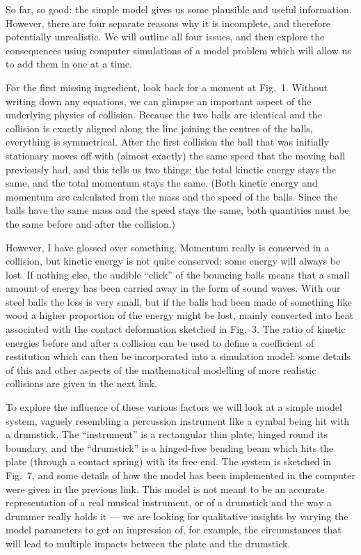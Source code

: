 
  So far, so good: the simple model gives us some plausible and useful 
  information. However, there are four separate reasons why it is incomplete, 
  and therefore potentially unrealistic. We will outline all four issues, and 
  then explore the consequences using computer simulations of a model problem 
  which will allow us to add them in one at a time. 

  For the first missing ingredient, look back for a moment at Fig.\ 1. Without 
  writing down any equations, we can glimpse an important aspect of the 
  underlying physics of collision. Because the two balls are identical and the 
  collision is exactly aligned along the line joining the centres of the balls, 
  everything is symmetrical. After the first collision the ball that was 
  initially stationary moves off with (almost exactly) the same speed that the 
  moving ball previously had, and this tells us two things: the total kinetic 
  energy stays the same, and the total momentum stays the same. (Both kinetic 
  energy and momentum are calculated from the mass and the speed of the balls. 
  Since the balls have the same mass and the speed stays the same, both 
  quantities must be the same before and after the collision.) 

  However, I have glossed over something. Momentum really is conserved in a 
  collision, but kinetic energy is not quite conserved: some energy will always 
  be lost. If nothing else, the audible “click” of the bouncing balls means 
  that a small amount of energy has been carried away in the form of sound 
  waves. With our steel balls the loss is very small, but if the balls had been 
  made of something like wood a higher proportion of the energy might be lost, 
  mainly converted into heat associated with the contact deformation sketched 
  in Fig.\ 3. The ratio of kinetic energies before and after a collision can be 
  used to define a coefficient of restitution which can then be incorporated 
  into a simulation model: some details of this and other aspects of the 
  mathematical modelling of more realistic collisions are given in the next 
  link. 


  To explore the influence of these various factors we will look at a simple 
  model system, vaguely resembling a percussion instrument like a cymbal being 
  hit with a drumstick. The “instrument” is a rectangular thin plate, hinged 
  round its boundary, and the “drumstick” is a hinged-free bending beam which 
  hits the plate (through a contact spring) with its free end. The system is 
  sketched in Fig.\ 7, and some details of how the model has been implemented 
  in the computer were given in the previous link. This model is not meant to 
  be an accurate representation of a real musical instrument, or of a drumstick 
  and the way a drummer really holds it — we are looking for qualitative 
  insights by varying the model parameters to get an impression of, for 
  example, the circumstances that will lead to multiple impacts between the 
  plate and the drumstick. 

